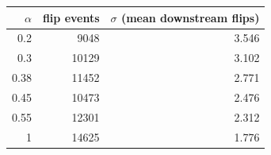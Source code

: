 \begin{tabular}{rrr}
\toprule
$\alpha$ & flip events & $\sigma$ (mean downstream flips) \\
\midrule
0.2 & 9048 & 3.546 \\
0.3 & 10129 & 3.102 \\
0.38 & 11452 & 2.771 \\
0.45 & 10473 & 2.476 \\
0.55 & 12301 & 2.312 \\
1 & 14625 & 1.776 \\
\bottomrule
\end{tabular}